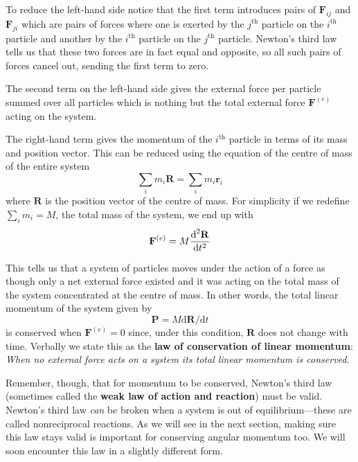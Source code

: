 \documentclass[english,seminar,headertitle]{lecture}
\begin{document}
To reduce the left-hand side notice that the first term introduces pairs of $\mathbf{F}_{ij}$ and $\mathbf{F}_{ji}$ which are pairs of forces where one is exerted by the $j^\textrm{th}$ particle on the $i^\textrm{th}$ particle and another by the $i^\textrm{th}$ particle on the $j^\textrm{th}$ particle. Newton's third law tells us that these two forces are in fact equal and opposite, so all such pairs of forces cancel out, sending the first term to zero.

The second term on the left-hand side gives the external force per particle summed over all particles which is nothing but the total external force $\mathbf{F}^{(e)}$ acting on the system.

The right-hand term gives the momentum of the $i^\textrm{th}$ particle in terms of its mass and position vector. This can be reduced using the equation of the centre of mass of the entire system 
\begin{equation}
\sum_i m_i \mathbf{R} = \sum_i m_i\mathbf{r}_i \label{eq:com}
\end{equation}%
where $\mathbf{R}$ is the position vector of the centre of mass. For simplicity if we redefine $\sum_i m_i = M$, the total mass of the system, we end up with $$\mathbf{F}^{(e)} = M {\textrm{d}^2\mathbf{R}\over\textrm{d}t^2}$$

This tells us that a system of particles moves under the action of a force as though only a net external force existed and it was acting on the total mass of the system concentrated at the centre of mass. In other words, the total linear momentum of the system given by
\begin{equation}
\mathbf{P} = M \textrm{d}\mathbf{R}/\textrm{d}t
\end{equation}%
is conserved when $\mathbf{F}^{(e)} = 0$ since, under this condition, $\mathbf{R}$ does not change with time. Verbally we state this as the \textbf{law of conservation of linear momentum}: \textit{When no external force acts on a system its total linear momentum is conserved}.

Remember, though, that for momentum to be conserved, Newton's third law (sometimes called the \textbf{weak law of action and reaction}) must be valid. Newton's third law \textit{can} be broken \cite{ivlev} when a system is out of equilibrium---these are called nonreciprocal reactions. As we will see in the next section, making sure this law stays valid is important for conserving angular momentum too. We will soon encounter this law in a slightly different form.
%
\end{document}
